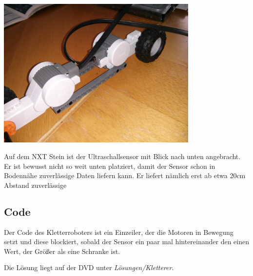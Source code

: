 \begin{capfigure}
	\includegraphics[width=10cm]{images/kletter3.jpg}
\end{capfigure}
    
Auf dem NXT Stein ist der Ultraschallsensor mit Blick nach unten angebracht. Er ist bewusst nicht so weit unten platziert, damit der Sensor schon in Bodennähe zuverlässige Daten liefern kann. Er liefert nämlich erst ab etwa 20cm Abstand zuverlässige 
    
\subsection{Code}
Der Code des Kletterroboters ist ein Einzeiler, der die Motoren in Bewegung setzt und diese blockiert, sobald der Sensor ein paar mal hintereinander den einen Wert, der Größer als eine Schranke ist. 
    
Die Lösung liegt auf der DVD unter \textit{Lösungen/Kletterer}. 